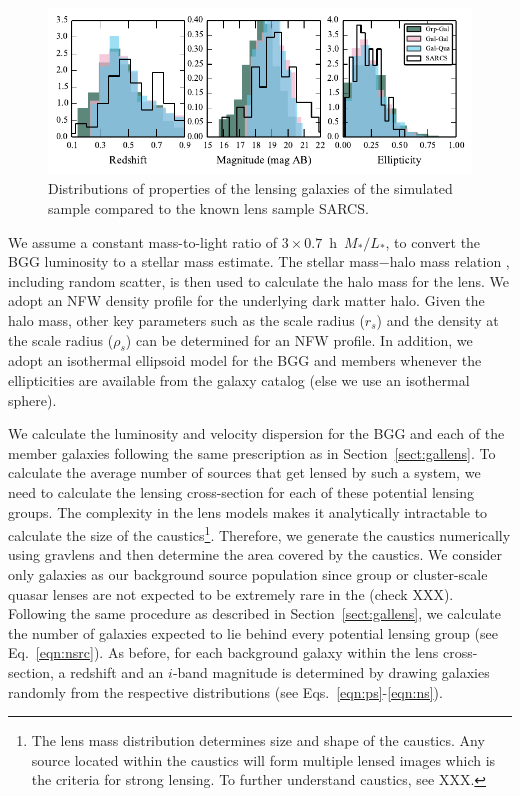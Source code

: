 \documentclass[useAMS,usenatbib,a4paper]{mn2e}
\begin{document}
\begin{figure}
\begin{center}
\includegraphics[scale=1.3]{sw-cfhtls-figs/lensprop.pdf}
\caption{ \label{fig:lensprop}
Distributions of properties of the lensing galaxies of the simulated
sample compared to the known lens sample SARCS.
}
\end{center}
\end{figure}

We assume a constant mass-to-light ratio of $3 \times 0.7$~h~$M_{*}/L_{*}$, to
convert the BGG luminosity to a stellar mass estimate. The stellar mass$-$halo
mass relation \citep{behroozi13}, including random scatter, is then used to
calculate the halo mass for the lens. We adopt an NFW density profile for the
underlying dark matter halo. Given the halo mass, other key parameters such as
the scale radius ($r_s$) and the density at the scale radius ($\rho_s$) can be
determined for an NFW profile. In addition, we adopt an isothermal ellipsoid
model for the BGG and members whenever the ellipticities are available from the
galaxy catalog (else we use an isothermal sphere).

We calculate the luminosity and velocity dispersion for the BGG and each of the
member galaxies following the same prescription as in
Section~\ref{sect:gallens}. To calculate the average number of sources that get
lensed by such a system, we need to calculate the lensing cross-section for each
of these potential lensing groups. The complexity in the lens models makes it
analytically intractable to calculate the size of the caustics\footnote{The lens
        mass distribution determines size and shape of the caustics. Any source
located within the caustics will form multiple lensed images which is the
criteria for strong lensing. To further understand caustics, see XXX.}.
Therefore, we generate the caustics numerically using {\sc gravlens} and then
determine the area covered by the caustics. We consider only galaxies as our
background source population since group or cluster-scale quasar lenses are not
expected to be extremely rare in the \cfhtls (check XXX).  Following the same procedure
as described in Section~\ref{sect:gallens}, we calculate the number of galaxies
expected to lie behind every potential lensing group (see Eq.~\ref{eqn:nsrc}).
As before, for each background galaxy within the lens cross-section, a redshift
and an $i$-band magnitude is determined by drawing galaxies randomly from the
respective distributions (see Eqs.~\ref{eqn:ps}-\ref{eqn:ns}).
\end{document}
